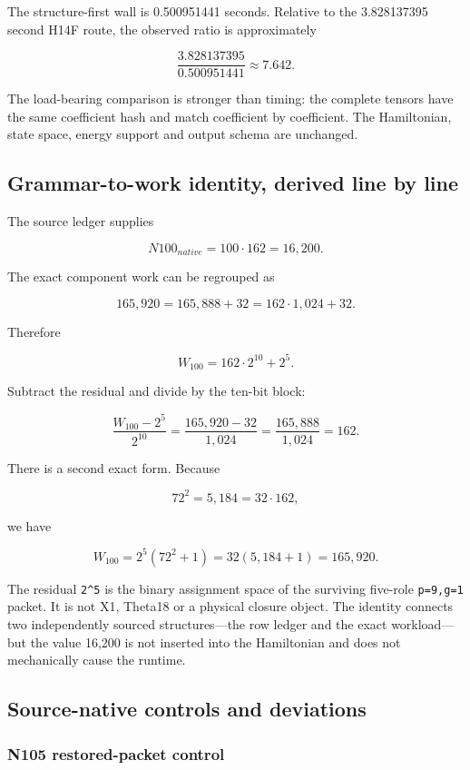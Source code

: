 The structure-first wall is 0.500951441 seconds. Relative to the
3.828137395 second H14F route, the observed ratio is approximately

\[
\frac{3.828137395}{0.500951441}\approx7.642.
\]

The load-bearing comparison is stronger than timing: the complete
tensors have the same coefficient hash and match coefficient by
coefficient. The Hamiltonian, state space, energy support and output
schema are unchanged.

\subsection{Grammar-to-work identity, derived line by
line}\label{viii-ch01-grammar-to-work-identity-derived-line-by-line}

The source ledger supplies

\[
N100_{native}=100\cdot162=16{,}200.
\]

The exact component work can be regrouped as

\[
165{,}920=165{,}888+32=162\cdot1{,}024+32.
\]

Therefore

\[
W_{100}=162\cdot2^{10}+2^5.
\]

Subtract the residual and divide by the ten-bit block:

\[
\frac{W_{100}-2^5}{2^{10}}
=\frac{165{,}920-32}{1{,}024}
=\frac{165{,}888}{1{,}024}
=162.
\]

There is a second exact form. Because

\[
72^2=5{,}184=32\cdot162,
\]

we have

\[
W_{100}=2^5(72^2+1)=32(5{,}184+1)=165{,}920.
\]

The residual \texttt{2\^{}5} is the binary assignment space of the
surviving five-role \texttt{p=9,g=1} packet. It is not X1, Theta18 or a
physical closure object. The identity connects two independently sourced
structures---the row ledger and the exact workload---but the value
16,200 is not inserted into the Hamiltonian and does not mechanically
cause the runtime.

\subsection{Source-native controls and
deviations}\label{viii-ch01-source-native-controls-and-deviations}

\subsubsection{N105 restored-packet
control}\label{viii-ch01-n105-restored-packet-control}

